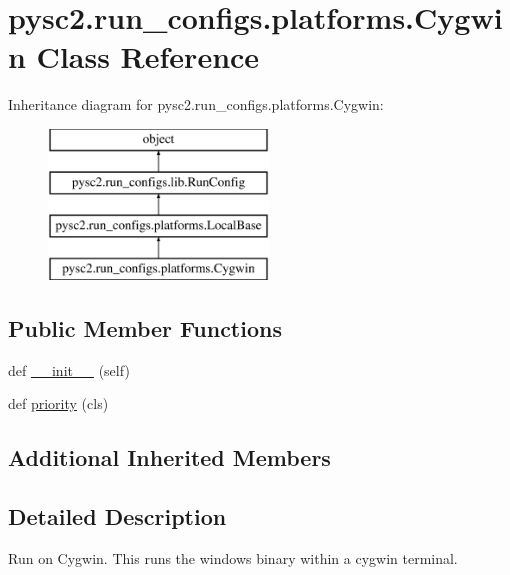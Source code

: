 \hypertarget{classpysc2_1_1run__configs_1_1platforms_1_1_cygwin}{}\section{pysc2.\+run\+\_\+configs.\+platforms.\+Cygwin Class Reference}
\label{classpysc2_1_1run__configs_1_1platforms_1_1_cygwin}
Inheritance diagram for pysc2.\+run\+\_\+configs.\+platforms.\+Cygwin\+:\begin{figure}[H]
\begin{center}
\leavevmode
\includegraphics[height=4.000000cm]{classpysc2_1_1run__configs_1_1platforms_1_1_cygwin}
\end{center}
\end{figure}
\subsection*{Public Member Functions}
\begin{DoxyCompactItemize}
\item 
def \mbox{\hyperlink{classpysc2_1_1run__configs_1_1platforms_1_1_cygwin_a937136aea31d51f916be605e608bade0}{\+\_\+\+\_\+init\+\_\+\+\_\+}} (self)
\item 
def \mbox{\hyperlink{classpysc2_1_1run__configs_1_1platforms_1_1_cygwin_ad4c0c92b689396b1ed9759ba69cdc0c6}{priority}} (cls)
\end{DoxyCompactItemize}
\subsection*{Additional Inherited Members}


\subsection{Detailed Description}
\begin{DoxyVerb}Run on Cygwin. This runs the windows binary within a cygwin terminal.\end{DoxyVerb}
 

